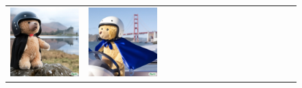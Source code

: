 \begin{figure}[ht!]
\begin{adjustwidth}{-0.8in}{-0.5in}
\begin{tabular}{cccccccccccccccccccc}
\multicolumn{3}{c}{\includegraphics[width=\twobytwocolwidth\textwidth]{figures/cherries/teddy_0.jpg}} &
\multicolumn{3}{c}{\includegraphics[width=\twobytwocolwidth\textwidth]{figures/cherries/teddy_1.jpg}} &&

\end{tabular}
\end{adjustwidth}
\end{figure}
